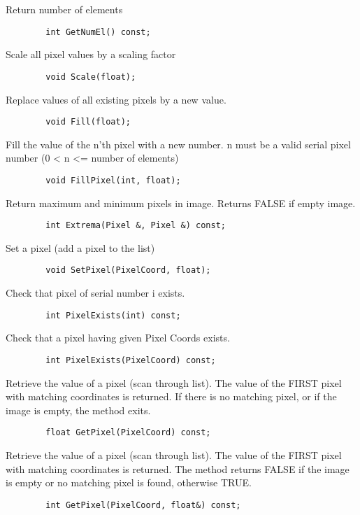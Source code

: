            Return number of elements
\begin{verbatim}
        int GetNumEl() const;
\end{verbatim}

           Scale all pixel values by a scaling factor
\begin{verbatim}
        void Scale(float);
\end{verbatim}

           Replace values of all existing pixels by a new value.
\begin{verbatim}
        void Fill(float);
\end{verbatim}

           Fill the value of the n'th pixel with a new number.
           n must be a valid serial pixel number (0 < n  <= 
           number of elements)
\begin{verbatim}
        void FillPixel(int, float);
\end{verbatim}

           Return maximum and minimum pixels in image.
           Returns FALSE if empty image.
\begin{verbatim}
        int Extrema(Pixel &, Pixel &) const;
\end{verbatim}

           Set a pixel (add a pixel to the list)
\begin{verbatim}
        void SetPixel(PixelCoord, float);
\end{verbatim}

           Check that pixel of serial number i exists.
\begin{verbatim}
        int PixelExists(int) const;
\end{verbatim}

           Check that a pixel having given Pixel Coords exists.
\begin{verbatim}
        int PixelExists(PixelCoord) const;
\end{verbatim}

           Retrieve the value of a pixel (scan through list). The value
           of the FIRST pixel with matching coordinates is returned. If
           there is no matching pixel, or if the image is empty, the
           method exits.
\begin{verbatim}
        float GetPixel(PixelCoord) const;
\end{verbatim}

           Retrieve the value of a pixel (scan through list). The value
           of the FIRST pixel with matching coordinates is returned.
           The method returns FALSE if the image is empty or no
           matching pixel is found, otherwise TRUE.
\begin{verbatim}
        int GetPixel(PixelCoord, float&) const;
\end{verbatim}

